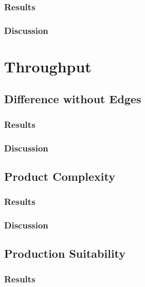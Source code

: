 \subsubsection{Results}

\subsubsection{Discussion}

\section{Throughput}
\label{ch:evaluation:se:throughput}

\subsection{Difference without Edges}

\subsubsection{Results}

\subsubsection{Discussion}

\subsection{Product Complexity}

\subsubsection{Results}

\subsubsection{Discussion}

\subsection{Production Suitability}

\subsubsection{Results}

